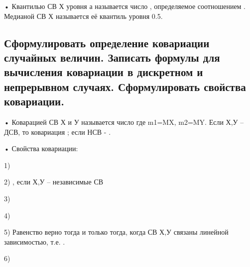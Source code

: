 • Квантилью СВ Х уровня а называется число , определяемое соотношением . Медианой СВ Х называется её квантиль уровня 0.5.

\subsection{Сформулировать определение ковариации случайных величин. Записать формулы для вычисления ковариации в дискретном и непрерывном случаях. Сформулировать свойства ковариации.}

• Коварацией СВ Х и У называется число  где m1=MX, m2=MY.
Если Х,У – ДСВ, то ковариация ;  если НСВ - .

• Свойства ковариации:

1) 

2) , если Х,У – независимые СВ

3) 

4) 

5) Равенство  верно тогда и только тогда, когда СВ Х,У связаны линейной зависимостью, т.е. .

6) 
